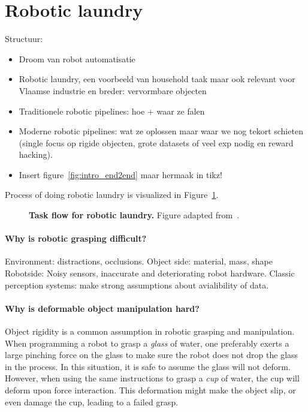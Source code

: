 \documentclass[\home/main.tex]{subfiles}
\begin{document}
\section{Robotic laundry}
Structuur:
\begin{itemize}
    \item Droom van robot automatisatie
    \item Robotic laundry, een voorbeeld van household taak maar ook relevant voor Vlaamse industrie en breder: vervormbare objecten
    \item Traditionele robotic pipelines: hoe + waar ze falen
    \item Moderne robotic pipelines: wat ze oplossen maar waar we nog tekort schieten (single focus op rigide objecten, grote datasets of veel exp nodig en reward hacking).
    \item Insert figure~\ref{fig:intro_end2end} maar hermaak in tikz!
\end{itemize}

Process of doing robotic laundry is visualized in Figure~\ref{fig:intro_robotic_laundry}.

\begin{figure}[htbp]
    \centering
	
    \caption[Task flow for robotic laundry.]{\textbf{Task flow for robotic laundry.} Figure adapted from~\autocite{Hamajima1996}.}
    \label{fig:intro_robotic_laundry}
\end{figure}

\paragraph{Why is robotic grasping difficult?}
Environment: distractions, occlusions.
Object side: material, mass, shape
Robotside: Noisy sensors, inaccurate and deteriorating robot hardware.
Classic perception systems: make strong assumptions about avialibility of data. 


\paragraph{Why is deformable object manipulation hard?}
Object rigidity is a common assumption in robotic grasping and manipulation. When programming a robot to grasp a \emph{glass} of water, one preferably exerts a large pinching force on the glass to make sure the robot does not drop the glass in the process. In this situation, it is safe to assume the glass will not deform. However, when using the same instructions to grasp a \emph{cup} of water, the cup will deform upon force interaction. This deformation might make the object slip, or even damage the cup, leading to a failed grasp.
\end{document}
